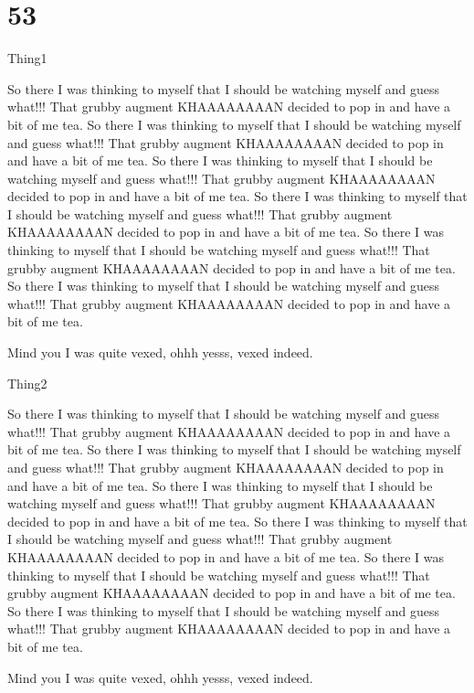 \chapter{53}

\begin{define}{Thing1} 

So there I was thinking to myself that I should be 
watching myself and guess what!!!
That grubby augment KHAAAAAAAAN decided to pop in and have a bit of
me tea. 
So there I was thinking to myself that I should be 
watching myself and guess what!!!
That grubby augment KHAAAAAAAAN decided to pop in and have a bit of
me tea. So there I was thinking to myself that I should be 
watching myself and guess what!!!
That grubby augment KHAAAAAAAAN decided to pop in and have a bit of
me tea. So there I was thinking to myself that I should be 
watching myself and guess what!!!
That grubby augment KHAAAAAAAAN decided to pop in and have a bit of
me tea. 
So there I was thinking to myself that I should be 
watching myself and guess what!!!
That grubby augment KHAAAAAAAAN decided to pop in and have a bit of
me tea. So there I was thinking to myself that I should be 
watching myself and guess what!!!
That grubby augment KHAAAAAAAAN decided to pop in and have a bit of
me tea. 

Mind you I was quite vexed, ohhh yesss, vexed indeed.     

\end{define}

\begin{define}{Thing2}

So there I was thinking to myself that I should be 
watching myself and guess what!!!
That grubby augment KHAAAAAAAAN decided to pop in and have a bit of
me tea. 
So there I was thinking to myself that I should be 
watching myself and guess what!!!
That grubby augment KHAAAAAAAAN decided to pop in and have a bit of
me tea. So there I was thinking to myself that I should be 
watching myself and guess what!!!
That grubby augment KHAAAAAAAAN decided to pop in and have a bit of
me tea. So there I was thinking to myself that I should be 
watching myself and guess what!!!
That grubby augment KHAAAAAAAAN decided to pop in and have a bit of
me tea. 
So there I was thinking to myself that I should be 
watching myself and guess what!!!
That grubby augment KHAAAAAAAAN decided to pop in and have a bit of
me tea. So there I was thinking to myself that I should be 
watching myself and guess what!!!
That grubby augment KHAAAAAAAAN decided to pop in and have a bit of
me tea. 

Mind you I was quite vexed, ohhh yesss, vexed indeed.   

\end{define}

